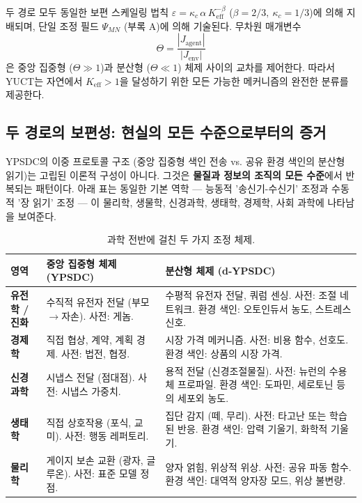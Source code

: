 \documentclass[11pt,a4paper]{article}
\begin{document}
\medskip
\noindent
두 경로 모두 동일한 보편 스케일링 법칙 $\varepsilon = \kappa_c \, \alpha \, K_{\mathrm{eff}}^{-\beta}$ ($\beta = 2/3,\ \kappa_c = 1/3$)에 의해 지배되며, 단일 조정 필드 $\Psi_{MN}$ (부록 A)에 의해 기술된다. 무차원 매개변수
\[
\Theta = \frac{|J_{\mathrm{agent}}|}{|J_{\mathrm{env}}|}
\]
은 중앙 집중형 ($\Theta \gg 1$)과 분산형 ($\Theta \ll 1$) 체제 사이의 교차를 제어한다. 따라서 YUCT는 자연에서 $K_{\mathrm{eff}} > 1$을 달성하기 위한 모든 가능한 메커니즘의 완전한 분류를 제공한다.

\subsection{두 경로의 보편성: 현실의 모든 수준으로부터의 증거}
\label{subsec:universality-two-paths}

YPSDC의 이중 프로토콜 구조 (중앙 집중형 색인 전송 vs. 공유 환경 색인의 분산형 읽기)는 고립된 이론적 구성이 아니다. 그것은 \textbf{물질과 정보의 조직의 모든 수준}에서 반복되는 패턴이다. 아래 표는 동일한 기본 역학 — 능동적 '송신기-수신기' 조정과 수동적 '장 읽기' 조정 — 이 물리학, 생물학, 신경과학, 생태학, 경제학, 사회 과학에 나타남을 보여준다.

\begin{table}[htbp]
	\centering
	\caption{과학 전반에 걸친 두 가지 조정 체제.}
	\label{tab:two-regimes-sciences}
	\begin{tabular}{p{3.0cm}p{5.5cm}p{6.5cm}}
		\toprule
		\textbf{영역} & \textbf{중앙 집중형 체제 (YPSDC)} & \textbf{분산형 체제 (d‑YPSDC)} \\
		\midrule
		\textbf{유전학 / 진화} &
		수직적 유전자 전달 (부모$\to$자손). 사전: 게놈. &
		수평적 유전자 전달, 쿼럼 센싱. 사전: 조절 네트워크. 환경 색인: 오토인듀서 농도, 스트레스 신호. \\
		\midrule
		\textbf{경제학} &
		직접 협상, 계약, 계획 경제. 사전: 법전, 협정. &
		시장 가격 메커니즘. 사전: 비용 함수, 선호도. 환경 색인: 상품의 시장 가격. \\
		\midrule
		\textbf{신경과학} &
		시냅스 전달 (점대점). 사전: 시냅스 가중치. &
		용적 전달 (신경조절물질). 사전: 뉴런의 수용체 프로파일. 환경 색인: 도파민, 세로토닌 등의 세포외 농도. \\
		\midrule
		\textbf{생태학} &
		직접 상호작용 (포식, 교미). 사전: 행동 레퍼토리. &
		집단 감지 (떼, 무리). 사전: 타고난 또는 학습된 반응. 환경 색인: 압력 기울기, 화학적 기울기. \\
		\midrule
		\textbf{물리학} &
		게이지 보손 교환 (광자, 글루온). 사전: 표준 모델 정점. &
		양자 얽힘, 위상적 위상. 사전: 공유 파동 함수. 환경 색인: 대역적 양자장 모드, 위상 불변량. \\
		\bottomrule
	\end{tabular}
\end{table}
\end{document}
